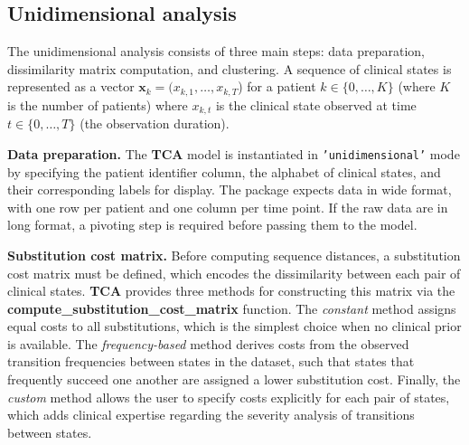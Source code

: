 \documentclass[pdflatex,sn-mathphys-num,referee,lineno]{sn-jnl}
\newcommand{\code}[1]{\texttt{#1}}
\newcommand{\pkg}[1]{\textbf{#1}}
\begin{document}
\subsection{Unidimensional analysis}\label{sec:uni}

The unidimensional analysis consists of three main steps: data preparation, dissimilarity matrix computation, and clustering.
A sequence of clinical states is represented as a vector $\boldsymbol{x}_k = (x_{k,1}, \ldots, x_{k,T}$) for a patient $k \in \{0, \ldots, K\}$ (where $K$ is the number of patients) where $x_{k,t}$ is the clinical state observed at time $t \in \{0, \ldots, T\}$ (the observation duration).

\textbf{Data preparation.}
The \pkg{TCA} model is instantiated in \code{'unidimensional'} mode by specifying the patient identifier column, the alphabet of clinical states, and their corresponding labels for display. The package expects data in wide format, with one row per patient and one column per time point. If the raw data are in long format, a pivoting step is required before passing them to the model.

\textbf{Substitution cost matrix.}
Before computing sequence distances, a substitution cost matrix must be defined, which encodes the dissimilarity between each pair of clinical states. 
\pkg{TCA} provides three methods for constructing this matrix via the \pkg{compute\_substitution\_cost\_matrix} function. 
The \emph{constant} method assigns equal costs to all substitutions, which is the simplest choice when no clinical prior is available. 
The \emph{frequency-based} method derives costs from the observed transition frequencies between states in the dataset, such that states that frequently succeed one another are assigned a lower substitution cost. 
Finally, the \emph{custom} method allows the user to specify costs explicitly for each pair of states, which adds clinical expertise regarding the severity analysis of transitions between states.
\end{document}
